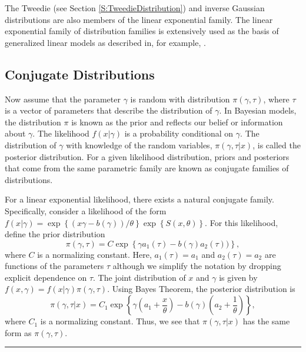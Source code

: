\documentclass[]{book}
\theoremstyle{definition}
\theoremstyle{definition}
\theoremstyle{definition}
\theoremstyle{remark}
\begin{document}
The Tweedie (see Section \ref{S:TweedieDistribution}) and inverse
Gaussian distributions are also members of the linear exponential
family. The linear exponential family of distribution families is
extensively used as the basis of generalized linear models as described
in, for example, \citet{frees2009regression}.

\subsection{Conjugate Distributions}\label{conjugate-distributions}

Now assume that the parameter \(\gamma\) is random with distribution
\(\pi(\gamma, \tau)\), where \(\tau\) is a vector of parameters that
describe the distribution of \(\gamma\). In Bayesian models, the
distribution \(\pi\) is known as the prior and reflects our belief or
information about \(\gamma\). The likelihood \(f(x|\gamma)\) is a
probability conditional on \(\gamma\). The distribution of \(\gamma\)
with knowledge of the random variables, \(\pi(\gamma,\tau| x)\), is
called the posterior distribution. For a given likelihood distribution,
priors and posteriors that come from the same parametric family are
known as conjugate families of distributions.

For a linear exponential likelihood, there exists a natural conjugate
family. Specifically, consider a likelihood of the form
\(f(x|\gamma) = \exp \left\{(x\gamma -b(\gamma))/\theta\right\} \exp \left\{S\left( x,\theta \right) \right\}\).
For this likelihood, define the prior distribution \[
\pi(\gamma,\tau) = C \exp\left\{
\gamma a_1(\tau) - b(\gamma)a_2(\tau))\right\},
\] where \(C\) is a normalizing constant. Here, \(a_1(\tau)=a_1\) and
\(a_2(\tau)=a_2\) are functions of the parameters \(\tau\) although we
simplify the notation by dropping explicit dependence on \(\tau\). The
joint distribution of \(x\) and \(\gamma\) is given by
\(f(x,\gamma) = f(x|\gamma) \pi(\gamma,\tau)\). Using Bayes Theorem, the
posterior distribution is \[
\pi(\gamma,\tau|x) = C_1 \exp\left\{
\gamma \left( a_1+\frac{x}{\theta}\right) - b(\gamma)\left( a_2+\frac{1}{\theta}\right)\right\},
\] where \(C_1\) is a normalizing constant. Thus, we see that
\(\pi(\gamma,\tau|x)\) has the same form as \(\pi(\gamma,\tau)\).

\begin{center}\rule{0.5\linewidth}{\linethickness}\end{center}
\end{document}
